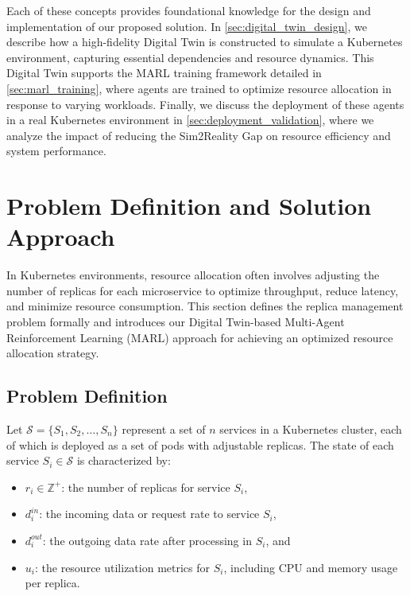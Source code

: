 \documentclass[conference]{IEEEtran}
\begin{document}
Each of these concepts provides foundational knowledge for the design and implementation of our proposed solution. In \autoref{sec:digital_twin_design}, we describe how a high-fidelity Digital Twin is constructed to simulate a Kubernetes environment, capturing essential dependencies and resource dynamics. This Digital Twin supports the MARL training framework detailed in \autoref{sec:marl_training}, where agents are trained to optimize resource allocation in response to varying workloads. Finally, we discuss the deployment of these agents in a real Kubernetes environment in \autoref{sec:deployment_validation}, where we analyze the impact of reducing the Sim2Reality Gap on resource efficiency and system performance.


\section{Problem Definition and Solution Approach}
\label{sec:problem_definition_solution}
In Kubernetes environments, resource allocation often involves adjusting the number of replicas for each microservice to optimize throughput, reduce latency, and minimize resource consumption. This section defines the replica management problem formally and introduces our Digital Twin-based Multi-Agent Reinforcement Learning (MARL) approach for achieving an optimized resource allocation strategy.

\subsection{Problem Definition}

Let $\mathcal{S} = \{S_1, S_2, \dots, S_n\}$ represent a set of $n$ services in a Kubernetes cluster, each of which is deployed as a set of pods with adjustable replicas. The state of each service $S_i \in \mathcal{S}$ is characterized by:
\begin{itemize}
    \item $\mathit{r_i} \in \mathbb{Z}^+$: the number of replicas for service $S_i$,
    \item $\mathit{d_i^{in}}$: the incoming data or request rate to service $S_i$,
    \item $\mathit{d_i^{out}}$: the outgoing data rate after processing in $S_i$, and
    \item $\mathit{u_i}$: the resource utilization metrics for $S_i$, including CPU and memory usage per replica.
\end{itemize}
\end{document}
